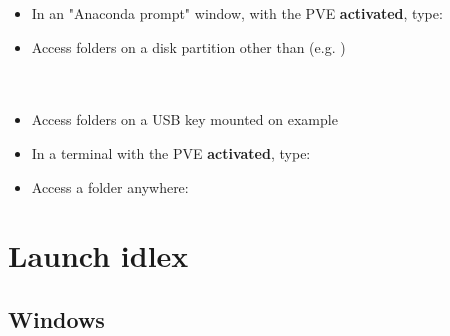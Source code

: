 \documentclass[10pt,serif,mathserif,compress,hyperref={colorlinks}]{beamer}
\begin{document}
\begin{frame}

  \begin{tcolorbox}[title={\bf Windows}: launch {\bf jupyter notebook}]
 
    \begin{itemize}
    \item In an "Anaconda prompt" window, with the  PVE {\bf activated}, type:\\
    \item Access folders on a disk partition other than  (e.g. )\\
      \\
      \\
    \item Access folders on a USB key mounted on example \\
    \end{itemize}
   
  \end{tcolorbox}

  \begin{tcolorbox}[title={\bf macOS \& GNU/Linux}: launch {\bf jupyter notebook}]
      
    \begin{itemize}
    \item In a terminal with the  PVE {\bf activated}, type:\\
    \item Access a folder anywhere:\\
    \end{itemize}

   \end{tcolorbox}  
\end{frame}

\section{Launch idlex}

\subsection{Windows}
\end{document}
